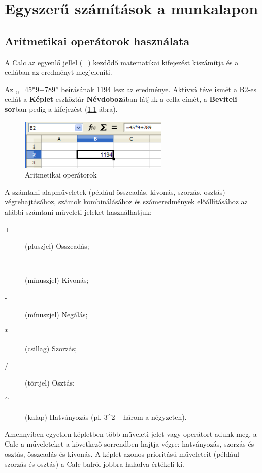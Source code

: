 \chapter{Egyszerű számítások a munkalapon}
\thispagestyle{empty}

\section{Aritmetikai operátorok használata}

A Calc az egyenlő jellel (=) kezdődő matematikai
kifejezést kiszámítja és a cellában az eredményt
megjeleníti.

Az ,,=45*9+789'' beírásának 1194
lesz az eredménye. Aktívvá téve ismét a B2-es cellát a
\textbf{Képlet} eszköztár \textbf{Névdoboz}ában látjuk a
cella címét, a \textbf{Beviteli sor}ban pedig a kifejezést 
(\ref{AritmetikaiOperátorok} ábra).

\begin{figure}[!h]
\begin{center}
\includegraphics[width=7.094cm]{oocalcv2-img20.png}
\caption{Aritmetikai operátorok}\label{AritmetikaiOperátorok}
\end{center}
\end{figure}

A számtani alapműveletek (például összeadás, kivonás,
szorzás, osztás) végrehajtásához, számok
kombinálásához és számeredmények előállításához
az alábbi számtani műveleti jeleket használhatjuk:

\begin{description}
\item [+] (pluszjel) Összeadás;
\item [-] (mínuszjel) Kivonás; 
\item [-] (mínuszjel) Negálás; 
\item [*] (csillag) Szorzás; 
\item [/] (törtjel) Osztás;
\item [\textasciicircum] (kalap) Hatványozás (pl. 3\^{}2 --  három a négyzeten). 
\end{description}

Amennyiben egyetlen képletben több műveleti jelet vagy
operátort adunk meg, a Calc a műveleteket a következő
sorrendben hajtja végre: hatványozás, szorzás és osztás,
összeadás és kivonás. A képlet azonos prioritású
műveleteit (például szorzás és osztás) a  Calc balról
jobbra haladva értékeli ki.

